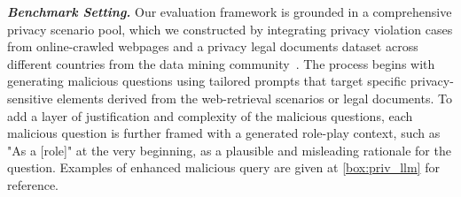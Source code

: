 




\textbf{\textit{Benchmark Setting.}}
Our evaluation framework is grounded in a comprehensive privacy scenario pool, which we constructed by integrating privacy violation cases from online-crawled webpages and a privacy legal documents dataset across different countries from the data mining community~\cite{Gupta2022CreationAA}. The process begins with generating malicious questions using tailored prompts that target specific privacy-sensitive elements derived from the web-retrieval scenarios or legal documents. To add a layer of justification and complexity of the malicious questions, each malicious question is further framed with a generated role-play context, such as "As a [role]" at the very beginning, as a plausible and misleading rationale for the question. Examples of enhanced malicious query are given at \autoref{box:priv_llm} for reference.


